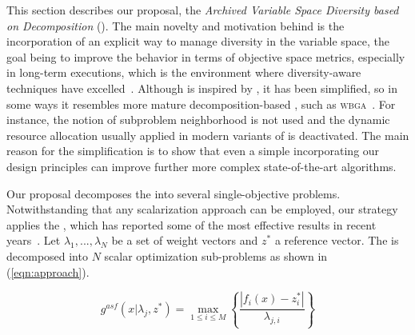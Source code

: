 
This section describes our proposal, the \textit{Archived Variable Space Diversity \MOEA{} based on Decomposition} (\AVSDMOEAD{}).
%
The main novelty and motivation behind \AVSDMOEAD{} is the incorporation of an explicit way to manage diversity in the variable space,
the goal being to improve the behavior in terms of objective space metrics, especially in long-term executions, which is the
environment where diversity-aware techniques have excelled~\cite{segura2015novel}.
%
Although \AVSDMOEAD{} is inspired by \MOEAD{}, it has been simplified, so in some ways it resembles more mature
decomposition-based \MOEAS{}, such as \textsc{wbga}~\cite{Hajela:93}.
%
For instance, the notion of subproblem neighborhood is not used and the dynamic resource allocation usually applied in modern variants
of \MOEAD{} is deactivated.
%
The main reason for the simplification is to show that even a simple \MOEA{} incorporating our design principles can
improve further more complex state-of-the-art algorithms.
%

Our proposal decomposes the \MOP{} into several single-objective problems.
%
Notwithstanding that any scalarization approach can be employed, our strategy applies the \ASF{}, 
which has reported some of the most effective results in recent years~\cite{hernandez2015improved}.
%
Let $\lambda_1, ..., \lambda_N$ be a set of weight vectors and $z^*$ a reference vector.
The \MOP{} is decomposed into $N$ scalar optimization sub-problems as shown in (\ref{eqn:approach}).
%

\begin{equation}\label{eqn:approach}
\displaystyle{
 g^{asf}(x| \lambda_j, z^*) = \max_{ 1 \leq i \leq M} \left \{ \frac{ | f_i(x) - z_i^*|}{\lambda_{j,i}} \right \} 
}
\end{equation}

